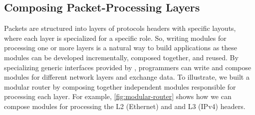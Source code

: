 \documentclass[letterpaper,twocolumn,10pt]{article}
\begin{document}
\subsection{Composing Packet-Processing Layers}
\label{subsection:composing-packet-processing-layers}
Packets are structured into layers of protocols headers with specific
layouts, where each layer is specialized for a specific role.  So,
writing modules for processing one or more layers is a natural way to
build applications as these modules can be developed incrementally,
composed together, and reused.
By specializing generic interfaces provided by \uarch, 
programmers can write and compose \ulang modules for different
network layers and exchange data.
To illustrate, we
built a modular router by composing together independent modules
responsible for processing each layer. For example,
\cref{fig:modular-router} shows how we can compose modules for
processing the L2 (Ethernet) and and L3 (IPv4) headers.
\end{document}
